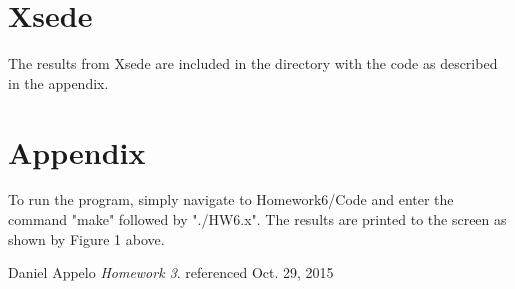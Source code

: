 \documentclass[12pt]{article}
\theoremstyle{definition}
\theoremstyle{definition}
\begin{document}
\section{Xsede}
The results from Xsede are included in the directory with the code as described in the appendix.

\section{Appendix}
To run the program, simply navigate to Homework6/Code and enter the command "make" followed by "./HW6.x". The results are printed to the screen as shown by Figure 1 above.
\\

\newpage
\begin{thebibliography}{9}
Daniel Appelo
\textit{Homework 3}. 
referenced Oct. 29, 2015

\end{thebibliography}
\end{document}
